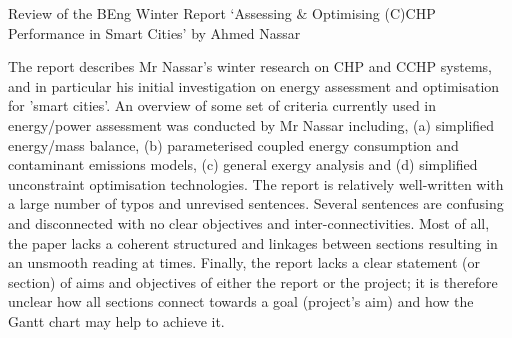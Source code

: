 \documentclass[14pt,twoside]{report}
\begin{document}
\begin{center}
  {\Large Review of the BEng Winter Report `Assessing $\&$ Optimising (C)CHP Performance in Smart Cities' by Ahmed Nassar}
\end{center}

The report describes Mr Nassar's winter research on CHP and CCHP systems, and in particular his initial investigation on energy assessment and optimisation for 'smart cities'. An overview of some set of criteria currently used in energy/power assessment was conducted by Mr Nassar including, (a) simplified energy/mass balance, (b) parameterised coupled energy consumption and contaminant emissions models, (c) general exergy analysis and (d) simplified unconstraint optimisation technologies. The report is relatively well-written with a large number of typos and unrevised sentences. Several sentences are confusing and disconnected with no clear objectives and inter-connectivities. Most of all, the paper lacks a coherent structured and linkages between sections resulting in an unsmooth reading at times. Finally, the report lacks a clear statement (or section) of aims and objectives of either the report or the project; it is therefore unclear how all sections connect towards a goal (project's aim) and how the Gantt chart may help to achieve it.
\end{document}
